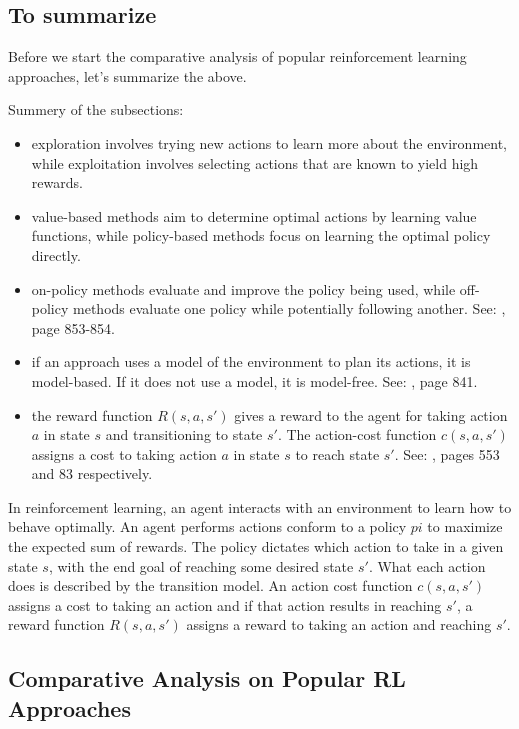 \newpage
\subsection{To summarize}

Before we start the comparative analysis of popular reinforcement learning approaches, let's summarize the above.

Summery of the subsections:
\begin{itemize}
    \item exploration involves trying new actions to learn more about the environment, while exploitation involves selecting actions that are known to yield high rewards.
    \item value-based methods aim to determine optimal actions by learning value functions, while \gls{policy}-based methods focus on learning the optimal \gls{policy} directly.
    \item on-\gls{policy} methods evaluate and improve the \gls{policy} being used, while off-\gls{policy} methods evaluate one \gls{policy} while potentially following another. See: \cite{rn2022aima}, page 853-854.
    \item if an approach uses a model of the environment to plan its actions, it is model-based. If it does not use a model, it is model-free. See: \cite{rn2022aima}, page 841.
    \item the \gls{reward function} $R(s, a, s')$ gives a reward to the \gls{agent} for taking action $a$ in state $s$ and transitioning to state $s'$. The \gls{action-cost function} $c(s, a, s')$ assigns a cost to taking action $a$ in state $s$ to reach state $s'$. See: \cite{rn2022aima}, pages 553 and 83 respectively.
\end{itemize}

In reinforcement learning, an agent interacts with an environment to learn how to behave optimally.
An agent performs actions conform to a \gls{policy} $pi$ to maximize the expected sum of rewards. 
The \gls{policy} dictates which action to take in a given state $s$, with the end goal of reaching some desired state $s'$.
What each action does is described by the \gls{transition model}.
An action cost function $c(s, a, s')$ assigns a cost to taking an action and if that action results in reaching $s'$, a \gls{reward function} $R(s, a, s')$ assigns a reward to taking an action and reaching $s'$.

\newpage
\subsection{Comparative Analysis on Popular RL Approaches}


